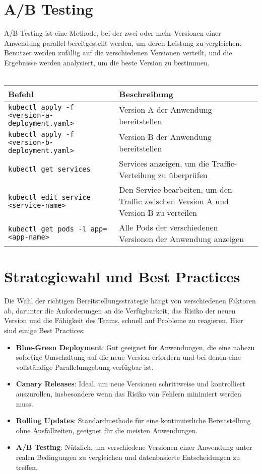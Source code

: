 \section{A/B Testing}
A/B Testing ist eine Methode, bei der zwei oder mehr Versionen einer Anwendung parallel bereitgestellt werden, um deren Leistung zu vergleichen. Benutzer werden zufällig auf die verschiedenen Versionen verteilt, und die Ergebnisse werden analysiert, um die beste Version zu bestimmen.\\
\phantom{.}\\
\begin{tabular}{|p{}|p{}|}
\hline
\textbf{Befehl} & \textbf{Beschreibung} \\
\hline
\texttt{kubectl apply -f <version-a-deployment.yaml>} & Version A der Anwendung bereitstellen \\
\texttt{kubectl apply -f <version-b-deployment.yaml>} & Version B der Anwendung bereitstellen \\
\texttt{kubectl get services} & Services anzeigen, um die Traffic-Verteilung zu überprüfen \\
\texttt{kubectl edit service <service-name>} & Den Service bearbeiten, um den Traffic zwischen Version A und Version B zu verteilen \\
\texttt{kubectl get pods -l app=<app-name>} & Alle Pods der verschiedenen Versionen der Anwendung anzeigen \\
\hline
\end{tabular}

\section{Strategiewahl und Best Practices}
Die Wahl der richtigen Bereitstellungsstrategie hängt von verschiedenen Faktoren ab, darunter die Anforderungen an die Verfügbarkeit, das Risiko der neuen Version und die Fähigkeit des Teams, schnell auf Probleme zu reagieren. Hier sind einige Best Practices:

\begin{itemize}
    \item \textbf{Blue-Green Deployment}: Gut geeignet für Anwendungen, die eine nahezu sofortige Umschaltung auf die neue Version erfordern und bei denen eine vollständige Parallelumgebung verfügbar ist.
    \item \textbf{Canary Releases}: Ideal, um neue Versionen schrittweise und kontrolliert auszurollen, insbesondere wenn das Risiko von Fehlern minimiert werden muss.
    \item \textbf{Rolling Updates}: Standardmethode für eine kontinuierliche Bereitstellung ohne Ausfallzeiten, geeignet für die meisten Anwendungen.
    \item \textbf{A/B Testing}: Nützlich, um verschiedene Versionen einer Anwendung unter realen Bedingungen zu vergleichen und datenbasierte Entscheidungen zu treffen.
\end{itemize}


